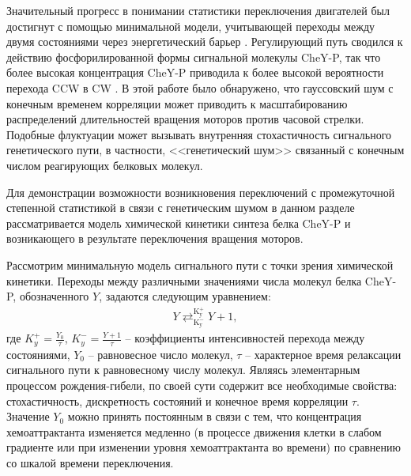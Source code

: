 Значительный прогресс в понимании статистики переключения двигателей был достигнут с помощью минимальной модели, учитывающей переходы между двумя состояниями через энергетический барьер \cite{tu_how_2005}. Регулирующий путь сводился к действию фосфорилированной формы сигнальной молекулы CheY-P, так что более высокая концентрация CheY-P приводила к более высокой вероятности перехода CCW в CW \cite{khan_steady-state_1980}. В этой работе было обнаружено, что гауссовский шум с конечным временем корреляции может приводить к масштабированию распределений длительностей вращения моторов против часовой стрелки. Подобные флуктуации может вызывать внутренняя стохастичность сигнального генетического пути, в частности, <<генетический шум>> связанный с конечным числом реагирующих белковых молекул.

Для демонстрации возможности возникновения переключений с промежуточной степенной статистикой в связи с генетическим шумом в данном разделе рассматривается модель химической кинетики синтеза белка CheY-P и возникающего в результате переключения вращения моторов. 

Рассмотрим минимальную модель сигнального пути с точки зрения химической кинетики. Переходы между различными значениями числа молекул белка CheY-P, обозначенного $Y$, задаются следующим уравнением:
\begin{equation}
    \begin{aligned}
        Y \mathrel{\mathop{\rightleftarrows}^{\mathrm{K_{y}^{+}}}_{\mathrm{K_{y}^{-}}}} Y + 1,
    \label{eq:chem}
    \end{aligned}
\end{equation}
где $K_{y}^{+}=\frac{Y_0}{\tau}$, $K_{y}^{-}=\frac{Y+1}{\tau}$ -- коэффициенты интенсивностей перехода между состояниями, $Y_0$ -- равновесное число молекул, $\tau$ -- характерное время релаксации сигнального пути к равновесному числу молекул. Являясь элементарным процессом рождения-гибели, по своей сути содержит все необходимые свойства: стохастичность, дискретность состояний и конечное время корреляции $\tau$. Значение $Y_0$ можно принять постоянным в связи с тем, что концентрация хемоаттрактанта изменяется медленно (в процессе движения клетки в слабом градиенте или при изменении уровня хемоаттрактанта во времени) по сравнению со шкалой времени переключения. 

